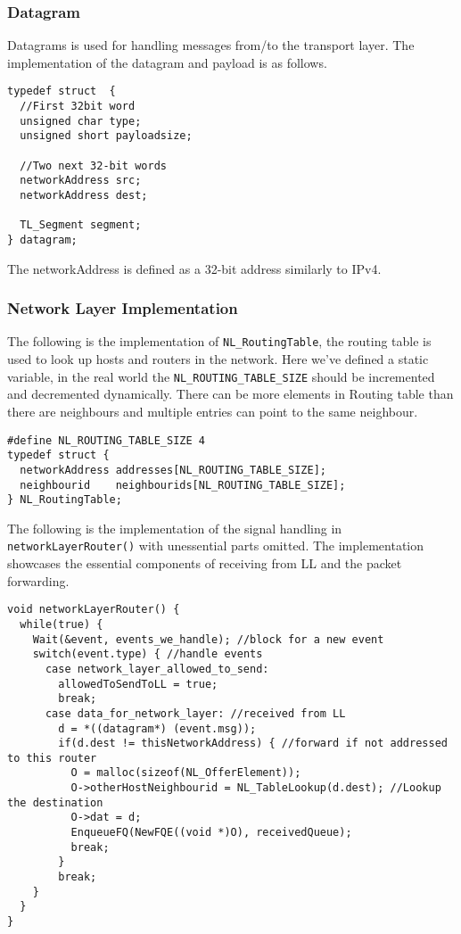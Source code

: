\subsubsection{Datagram}
Datagrams is used for handling messages from/to the transport layer.
The implementation of the datagram and payload is as follows.
\begin{lstlisting}
typedef struct  {
  //First 32bit word
  unsigned char type;
  unsigned short payloadsize;

  //Two next 32-bit words
  networkAddress src;
  networkAddress dest;

  TL_Segment segment;
} datagram;
\end{lstlisting}
The networkAddress is defined as a 32-bit address similarly to IPv4.

\subsubsection{Network Layer Implementation}

The following is the implementation of \texttt{NL\_RoutingTable}, the routing table is used to look up hosts and routers in the network.
Here we've defined a static variable, in the real world the \texttt{NL\_ROUTING\_TABLE\_SIZE} should be incremented and decremented dynamically.
There can be more elements in Routing table than there are neighbours and multiple entries can point to the same neighbour.
\begin{lstlisting}
#define NL_ROUTING_TABLE_SIZE 4
typedef struct {
  networkAddress addresses[NL_ROUTING_TABLE_SIZE];
  neighbourid    neighbourids[NL_ROUTING_TABLE_SIZE];
} NL_RoutingTable;
\end{lstlisting}

The following is the implementation of the signal handling in \texttt{networkLayerRouter()} with unessential parts omitted. The implementation showcases the essential components of receiving from LL and the packet forwarding.
\begin{lstlisting}
void networkLayerRouter() {
  while(true) {
    Wait(&event, events_we_handle); //block for a new event
    switch(event.type) { //handle events
      case network_layer_allowed_to_send:
        allowedToSendToLL = true;
        break;
      case data_for_network_layer: //received from LL
        d = *((datagram*) (event.msg));
        if(d.dest != thisNetworkAddress) { //forward if not addressed to this router
          O = malloc(sizeof(NL_OfferElement));
          O->otherHostNeighbourid = NL_TableLookup(d.dest); //Lookup the destination
          O->dat = d;
          EnqueueFQ(NewFQE((void *)O), receivedQueue);
          break;
        }
        break;
    }
  }
}
\end{lstlisting}

